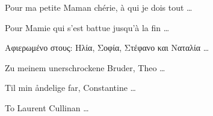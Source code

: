\begin{dedication} 

\vspace{1cm}
{\selectfont \foreignlanguage{french} {Pour ma petite Maman ch\'erie, \`a qui je dois tout \ldots}}

\vspace{1cm}
{\selectfont \foreignlanguage{french} {Pour Mamie qui s'est battue jusqu'\`a la fin \ldots}}

\vspace{1cm}
{ \foreignlanguage{greek} { Αφιερωμένο στους: Ηλία, Σοφία, Στέφανο και Ναταλία \ldots} }

\vspace{1cm}
{ \foreignlanguage{german} {Zu meinem unerschrockene Bruder, Theo \ldots} }

\vspace{1cm}
{ \foreignlanguage{danish} {Til min åndelige far, Constantine \ldots} }

\vspace{1cm}
To Laurent Cullinan \ldots

\end{dedication}

